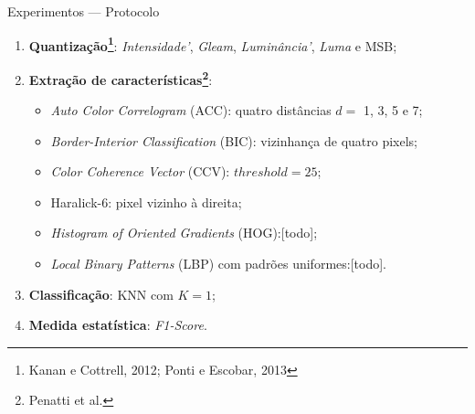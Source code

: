 \documentclass[10pt]{beamer}
\begin{document}
\begin{frame}{Experimentos --- Protocolo}
  \setlength\leftmargini{1em}
  \begin{block}{}
        \begin{enumerate}
      \item \textbf{Quantização\footnote{Kanan e Cottrell, 2012; Ponti e Escobar, 2013}}: \emph{Intensidade'}, \emph{Gleam}, \emph{Luminância'}, \emph{Luma} e MSB;
      \item \textbf{Extração de características\footnote{Penatti et al.}}:
      \begin{itemize}
        \item \textit{Auto Color Correlogram} (ACC): quatro distâncias $d =$ 1, 3, 5 e 7;
        \item \textit{Border-Interior Classification} (BIC): vizinhança de quatro pixels;
        \item \textit{Color Coherence Vector} (CCV): $\mathit{threshold} = 25$;
        \item Haralick-6: pixel vizinho à direita;
        \item \textit{Histogram of Oriented Gradients} (HOG):[todo];
        \item \textit{Local Binary Patterns} (LBP) com padrões uniformes:[todo].
      \end{itemize}
      \item \textbf{Classificação}: KNN com $K=1$;
      \item \textbf{Medida estatística}: \textit{F1-Score}.
    \end{enumerate}
  \end{block}
\end{frame}
\end{document}
